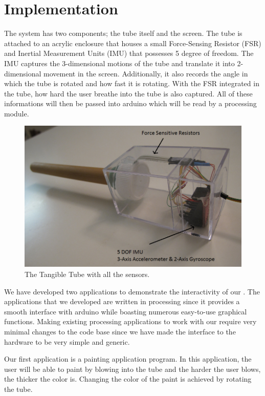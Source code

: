 \section{Implementation}\label{sec:impl}

The \tube system has two components; the tube itself and the screen. The tube is attached to an acrylic enclosure that houses a small Force-Sensing Resistor (FSR) and Inertial Measurement Units (IMU) that possesses 5 degree of freedom. The IMU captures the 3-dimensional motions of the tube and translate it into 2-dimensional movement in the screen. Additionally, it also records the angle in which the tube is rotated and how fast it is rotating. With the FSR integrated in the tube, how hard the user breathe into the tube is also captured. All of these informations will then be passed into arduino which will be read by a processing module.

\begin{figure}
  \centering
  \includegraphics[width=\linewidth]{./figs/impl1.png}
  \caption{The Tangible Tube with all the sensors.}
  \label{fig:impl1}
\end{figure}


We have developed two applications to demonstrate the interactivity of our \tube. The applications that we developed are written in processing since it provides a smooth interface with arduino while boasting numerous easy-to-use graphical functions. Making existing processing applications to work with our \tube require very minimal changes to the code base since we have made the interface to the hardware to be very simple and generic.

Our first application is a painting application program. In this application, the user will be able to paint by blowing into the tube and the harder the user blows, the thicker the color is. Changing the color of the paint is achieved by rotating the tube.

